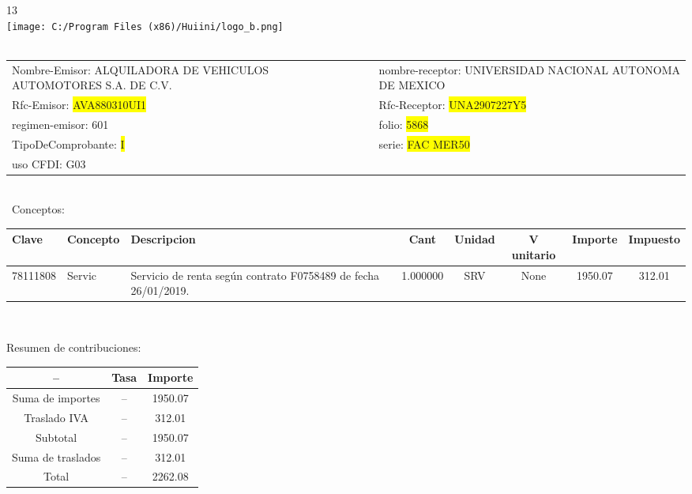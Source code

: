 \documentclass{article}
\begin{document}
\hspace{18cm} 13\\
\texttt{[image: C:/Program Files (x86)/Huiini/logo\_b.png]}
\bigskip\\\
\begin{tabular}{p{11cm}p{1cm}p{8cm}}

Nombre-Emisor: ALQUILADORA DE VEHICULOS AUTOMOTORES S.A. DE C.V. && nombre-receptor: UNIVERSIDAD NACIONAL AUTONOMA DE MEXICO\\

Rfc-Emisor: \colorbox{yellow}{ AVA880310UI1 } & & Rfc-Receptor: \colorbox{yellow}{ UNA2907227Y5 }\\

regimen-emisor: 601 & & folio: \colorbox{yellow}{ 5868 }\\

TipoDeComprobante: \colorbox{yellow}{ I } & & serie: \colorbox{yellow}{ FAC MER50 }\\

uso CFDI: G03\\



\end{tabular}
\bigskip\bigskip\bigskip\\\
Conceptos:\\
\begin{tabular}{|p{1.5cm}|p{3.6cm}|p{3.6cm}|c|c|c|c|c|}
\hline
Clave & Concepto & Descripcion & Cant & Unidad & V unitario & Importe & Impuesto \\
\hline

78111808 & Servic & Servicio de renta según contrato F0758489 de fecha 26/01/2019. & 1.000000 & SRV & None & 1950.07 &  312.01 \\
\hline

\end{tabular}\\
\bigskip
\begin{center}
Resumen de contribuciones:\\
\bigskip
\begin{tabular}{|c|c|c|}
\hline
 -- & Tasa & Importe\\
\hline

Suma de importes & -- & 1950.07 \\
\hline

Traslado IVA & -- & 312.01 \\
\hline

Subtotal  & -- & 1950.07 \\
\hline

Suma de traslados & -- & 312.01 \\
\hline

Total  & -- & 2262.08 \\
\hline

\end{tabular}
\end{center}
\end{document}
